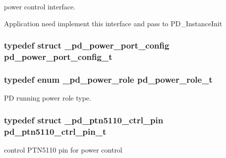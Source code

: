 power control interface. 

Application need implement this interface and pass to P\-D\-\_\-\-Instance\-Init \hypertarget{group__usb__pd__stack_ga1897a14a90aea9e4b0e7cf1e5b4ea449}{
\subsubsection[{pd\-\_\-power\-\_\-port\-\_\-config\-\_\-t}]{\setlength{\rightskip}{0pt plus 5cm}typedef struct {\bf \-\_\-pd\-\_\-power\-\_\-port\-\_\-config}  {\bf pd\-\_\-power\-\_\-port\-\_\-config\-\_\-t}}}\label{group__usb__pd__stack_ga1897a14a90aea9e4b0e7cf1e5b4ea449}
\hypertarget{group__usb__pd__stack_ga19f0723d5c2d772a03d075636497183f}{
\subsubsection[{pd\-\_\-power\-\_\-role\-\_\-t}]{\setlength{\rightskip}{0pt plus 5cm}typedef enum {\bf \-\_\-pd\-\_\-power\-\_\-role}  {\bf pd\-\_\-power\-\_\-role\-\_\-t}}}\label{group__usb__pd__stack_ga19f0723d5c2d772a03d075636497183f}


P\-D running power role type. 

\hypertarget{group__usb__pd__stack_ga78181fa98a71e19526770f8c1adea957}{
\subsubsection[{pd\-\_\-ptn5110\-\_\-ctrl\-\_\-pin\-\_\-t}]{\setlength{\rightskip}{0pt plus 5cm}typedef struct {\bf \-\_\-pd\-\_\-ptn5110\-\_\-ctrl\-\_\-pin}  {\bf pd\-\_\-ptn5110\-\_\-ctrl\-\_\-pin\-\_\-t}}}\label{group__usb__pd__stack_ga78181fa98a71e19526770f8c1adea957}


control P\-T\-N5110 pin for power control 

